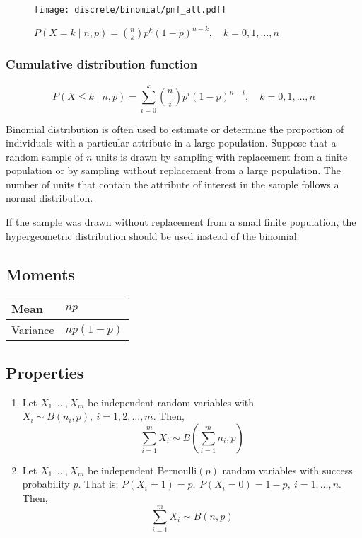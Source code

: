 \begin{figure}[H]
	\texttt{[image: discrete/binomial/pmf\_all.pdf]}
	\caption{$P(X = k \mid n, p) = \binom{n}{k}p^{k}(1 - p)^{n - k}, \quad k = 0, 1, \ldots, n$}
\end{figure}

\subsubsection{Cumulative distribution function}
\[
	P(X \leq k \mid n, p) = \sum_{i = 0}^{k} \binom{n}{i}p^{i}(1 - p)^{n - i}, \quad k = 0, 1, \ldots, n
\]

Binomial distribution is often used to estimate or determine the proportion of individuals with a particular attribute in a large population. Suppose that a random sample of $n$ units is drawn by sampling with replacement from a finite population or by sampling without replacement from a large population. The number of units that contain the attribute of interest in the sample follows a normal distribution.

If the sample was drawn without replacement from a small finite population, the hypergeometric distribution should be used instead of the binomial.

\subsection{Moments}

\begin{tabularx}{\textwidth}{s X}
	\hline
	Mean & $np$ \\\hline
	Variance & $np(1 - p)$\\\hline
\end{tabularx}

\subsection{Properties}
\begin{enumerate}
	\item Let $X_1, \ldots, X_m$ be independent random variables with $X_i \sim B(n_i, p), \ i = 1, 2, \ldots, m$. Then,
	\[
	\sum_{i = 1}^m X_i \sim B\left(\sum_{i = 1}^m n_i, p\right)
	\]
	\item Let $X_1, \ldots, X_m$ be independent Bernoulli$(p)$ random variables with success probability $p$. That is: $P(X_i = 1) = p, \ P(X_i = 0) = 1 - p, \ i = 1, \ldots, n$. Then,
	\[
	\sum_{i = 1}^m X_i \sim B\left(n, p\right)
	\]
\end{enumerate}


